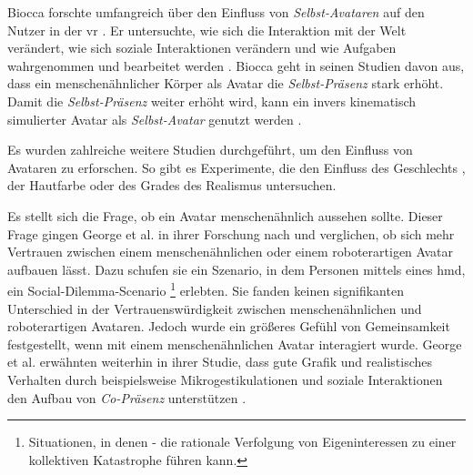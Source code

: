 \documentclass[a4paper,11pt]{article}%
\renewcommand{\\}{\vspace*{0.5\baselineskip} \newline}
\begin{document}
Biocca forschte umfangreich über den Einfluss von \textit{Selbst-Avataren} auf den Nutzer in der \ac{vr} \citep[421-427]{construal2014connected}.
\newline Er untersuchte, wie sich die Interaktion mit der Welt verändert, wie sich soziale Interaktionen verändern und wie Aufgaben wahrgenommen und bearbeitet werden \citep{benford1995user} \citep{bowers1996talk}.
Biocca geht in seinen Studien davon aus, dass ein menschenähnlicher Körper als Avatar die \textit{Selbst-Präsenz} stark erhöht. Damit die \textit{Selbst-Präsenz} weiter erhöht wird, kann ein invers kinematisch simulierter Avatar als \textit{Selbst-Avatar} genutzt werden \citep[421-427]{construal2014connected}.


Es wurden zahlreiche weitere Studien durchgeführt, um den Einfluss von Avataren zu erforschen. So gibt es Experimente, die den Einfluss des Geschlechts \citep{slater2010first}, der Hautfarbe \citep{peck2013putting} oder des Grades des Realismus \citep{roth2016avatar} untersuchen.

Es stellt sich die Frage, ob ein Avatar menschenähnlich aussehen sollte. Dieser Frage gingen George et al. \citep{george2018trusting} in ihrer Forschung nach und verglichen, ob sich mehr Vertrauen zwischen einem menschenähnlichen oder einem roboterartigen Avatar aufbauen lässt.
Dazu schufen sie ein Szenario, in dem Personen mittels eines \ac{hmd}, ein Social-Dilemma-Scenario \footnote{Situationen, in denen - die rationale Verfolgung von Eigeninteressen zu einer kollektiven Katastrophe führen kann.} erlebten. Sie fanden keinen signifikanten Unterschied in der Vertrauenswürdigkeit zwischen menschenähnlichen und roboterartigen Avataren. Jedoch wurde ein größeres Gefühl von Gemeinsamkeit festgestellt, wenn mit einem menschenähnlichen Avatar interagiert wurde.
George et al. erwähnten weiterhin in ihrer Studie, dass gute Grafik und realistisches Verhalten durch beispielsweise Mikrogestikulationen und soziale Interaktionen den Aufbau von \textit{Co-Präsenz} unterstützen \citep{george2018trusting}.
\end{document}
